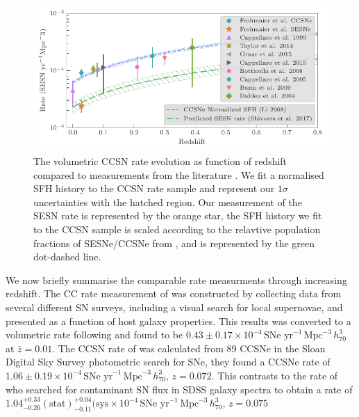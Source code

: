 \documentclass[a4paper,fleqn,usenatbib]{mnras}
\begin{document}
\begin{figure}
	\includegraphics[width=\linewidth]{./allCC_Compare_Literature.pdf}
    \caption{The volumetric CCSN rate evolution as function of redshift compared to measurements from the literature \citep{1999A&A...351..459C,2014ApJ...792..135T,2015MNRAS.450..905G,2015A&A...584A..62C,2008A&A...479...49B,2005A&A...430...83C,2009A&A...499..653B,2004ApJ...613..189D}. We fit a normalised SFH history \citep[blue dashed line;][]{2008MNRAS.388.1487L} to the CCSN rate sample and represent our $1\sigma$ uncertainties with the hatched region. Our measurement of the SESN rate is represented by the orange star, the SFH history we fit to the CCSN sample is scaled according to the relavtive population fractions of SESNe/CCSNe from \citet{2017PASP..129e4201S}, and is represented by the green dot-dashed line.}
    \label{fig:rates_CC_lit}
\end{figure}

We now briefly summarise the comparable rate measurments through increasing redshift. The CC rate measurement of \citet{1999A&A...351..459C} was constructed by collecting data from several different SN surveys, including a visual search for local supernovae, and presented as a function of host galaxy properties. This results was converted to a volumetric rate following \citet{2008A&A...479...49B} and found to be $0.43\pm 0.17 \times10^{-4}\,\text{SNe yr}^{-1}\,\text{Mpc}^{-3}\, h_{70}^{3} $ at $\bar{z}=0.01$. The CCSN rate of \citet{2014ApJ...792..135T} was calculated from 89 CCSNe in the Sloan Digital Sky Survey \citep[SDSS;][]{2000AJ....120.1579Y,2011AJ....142...72E} photometric search for SNe, they found a CCSNe rate of $1.06\pm 0.19 \times10^{-4}\,\text{SNe yr}^{-1}\,\text{Mpc}^{-3}\, h_{70}^{3} $, $z=0.072$. This contrasts to the rate of \citet{015MNRAS.450..905G} who searched for contaminant SN flux in SDSS galaxy spectra to obtain a rate of $1.04_{-0.26}^{+0.33}\mathrm{(stat)}_{-0.11}^{+0.04}\mathrm{(sys} \times10^{-4}\,\text{SNe yr}^{-1}\,\text{Mpc}^{-3}\, h_{70}^{3} $, $z=0.075$
\end{document}
